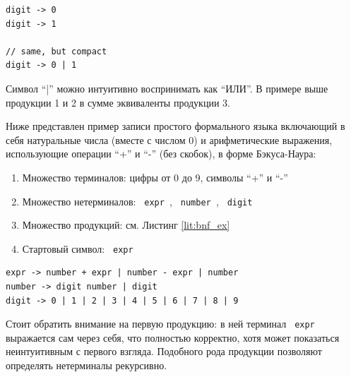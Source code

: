 \begin{code}
    \label{lit:prod}
    \begin{verbatim}
digit -> 0
digit -> 1

// same, but compact
digit -> 0 | 1
    \end{verbatim}
\end{code}

Символ \enquote{|} можно интуитивно воспринимать как \enquote{ИЛИ}. В примере выше продукции 1 и 2 в сумме эквиваленты продукции 3.

Ниже представлен пример записи простого формального языка включающий в себя натуральные числа (вместе с числом 0) и арифметические выражения, использующие операции \enquote{+} и \enquote{-} (без скобок), в форме Бэкуса-Наура: 
\begin{enumerate}
    \item Множество терминалов: цифры от 0 до 9, символы \enquote{+} и \enquote{-}
    \item Множество нетерминалов: \texttt{ expr }, \texttt{ number }, \texttt{ digit }
    \item Множество продукций: см. Листинг \ref{lit:bnf_ex}
    \item Стартовый символ: \texttt{ expr }
\end{enumerate}

\begin{code}
    \label{lit:bnf_ex}
    \begin{verbatim}
expr -> number + expr | number - expr | number
number -> digit number | digit
digit -> 0 | 1 | 2 | 3 | 4 | 5 | 6 | 7 | 8 | 9
    \end{verbatim}
\end{code}

Стоит обратить внимание на первую продукцию: в ней терминал \texttt{ expr } выражается сам через себя, что полностью корректно, хотя может показаться неинтуитивным с первого взгляда. Подобного рода продукции позволяют определять нетерминалы рекурсивно.

